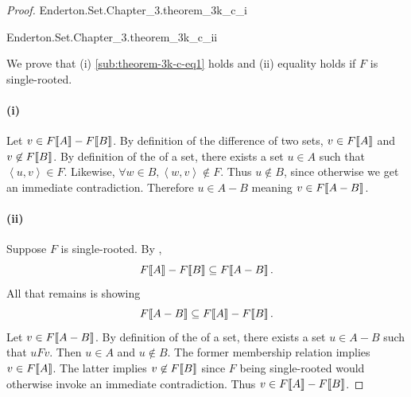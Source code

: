 \documentclass{report}
\begin{document}
\begin{proof}

  \statementpadding

    {Enderton.Set.Chapter\_3.theorem\_3k\_c\_i}

    {Enderton.Set.Chapter\_3.theorem\_3k\_c\_ii}

  We prove that (i) \eqref{sub:theorem-3k-c-eq1} holds and (ii) equality holds
    if $F$ is single-rooted.

  \paragraph{(i)}%
  \label{par:theorem-3k-c-i}

    Let $v \in F\!\left\llbracket A\right\rrbracket - F\!\left\llbracket B\right\rrbracket$.
    By definition of the difference of two sets,
      $v \in F\!\left\llbracket A\right\rrbracket$ and $v \not\in F\!\left\llbracket B\right\rrbracket$.
    By definition of the  of a set, there exists a set
      $u \in A$ such that $\left< u, v \right> \in F$.
    Likewise, $\forall w \in B, \left< w, v \right> \not\in F$.
    Thus $u \not\in B$, since otherwise we get an immediate contradiction.
    Therefore $u \in A - B$ meaning $v \in F\!\left\llbracket A - B\right\rrbracket$.

  \paragraph{(ii)}%

    Suppose $F$ is single-rooted.
    By ,
      $$F\!\left\llbracket A\right\rrbracket - F\!\left\llbracket B\right\rrbracket \subseteq F\!\left\llbracket A - B\right\rrbracket.$$
    All that remains is showing
      $$F\!\left\llbracket A - B\right\rrbracket \subseteq F\!\left\llbracket A\right\rrbracket - F\!\left\llbracket B\right\rrbracket.$$
    Let $v \in F\!\left\llbracket A - B\right\rrbracket$.
    By definition of the  of a set, there exists a set
      $u \in A - B$ such that $uFv$.
    Then $u \in A$ and $u \not\in B$.
    The former membership relation implies $v \in F\!\left\llbracket A\right\rrbracket$.
    The latter implies $v \not\in F\!\left\llbracket B\right\rrbracket$ since $F$ being single-rooted
      would otherwise invoke an immediate contradiction.
    Thus $v \in F\!\left\llbracket A\right\rrbracket - F\!\left\llbracket B\right\rrbracket$.

\end{proof}

\subsection{}%
\label{sub:corollary-3l}
\end{document}

